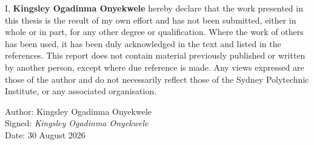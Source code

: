 I, \textbf{Kingsley Ogadinma Onyekwele} hereby declare that the work presented in this thesis is the result of my own effort and has not been submitted, either in whole or in part, for any other degree or qualification. Where the work of others has been used, it has been duly acknowledged in the text and listed in the references. This report does not contain material previously published or written by another person, except where due reference is made. Any views expressed are those of the author and do not necessarily reflect those of the Sydney Polytechnic Institute, or any associated organisation.

\begin{flushright}
\vspace{10pt}
Author: Kingsley Ogadinma Onyekwele \\
Signed: \textit{Kingsley Ogadinma Onyekwele} \\
Date: 30 August 2026 \\
\end{flushright}
